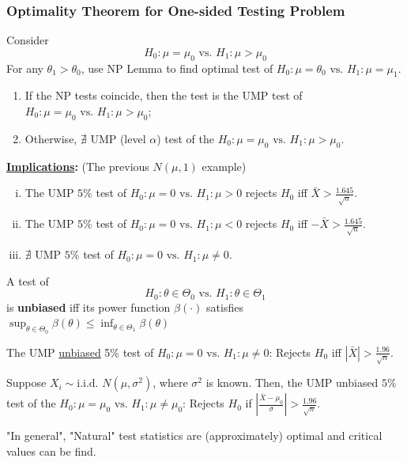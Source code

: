 \documentclass[11pt]{elegantbook}
\begin{document}
\subsubsection*{Optimality Theorem for One-sided Testing Problem}
Consider $$H_0:\mu=\mu_0 \text{ vs. }H_1:\mu>\mu_0$$
For any $\theta_1>\theta_0$, use NP Lemma to find optimal test of $H_0:\mu=\theta_0 \text{ vs. }H_1:\mu=\mu_1$.
\begin{enumerate}[$\circ$]
    \item If the NP tests coincide, then the test is the UMP test of $H_0:\mu=\mu_0 \text{ vs. }H_1:\mu>\mu_0$;
    \item Otherwise, $\nexists$ UMP (level $\alpha$) test of the $H_0:\mu=\mu_0 \text{ vs. }H_1:\mu>\mu_0$.
\end{enumerate}
\textbf{\underline{Implications}:} (The previous $N(\mu,1)$ example)
\begin{enumerate}[(i).]
    \item The UMP $5\%$ test of $H_0:\mu=0 \text{ vs. }H_1:\mu>0$ rejects $H_0$ iff $\bar{X}>\frac{1.645}{\sqrt{n}}$.
    \item The UMP $5\%$ test of $H_0:\mu=0 \text{ vs. }H_1:\mu<0$ rejects $H_0$ iff $-\bar{X}>\frac{1.645}{\sqrt{n}}$.
    \item $\nexists$ UMP $5\%$ test of $H_0:\mu=0 \text{ vs. }H_1:\mu\neq 0$.
\end{enumerate}

\begin{definition}
    \normalfont
    A test of $$H_0:\theta\in\Theta_0 \text{ vs. }H_1:\theta\in\Theta_1$$
    is \textbf{unbiased} iff its power function $\beta(\cdot)$ satisfies $\sup_{\theta\in\Theta_0}\beta(\theta)\leq \inf_{\theta\in\Theta_1}\beta(\theta)$
\end{definition}
\begin{claim}
    The UMP \underline{unbiased} 5\% test of $H_0:\mu=0 \text{ vs. }H_1:\mu\neq 0$: Rejects $H_0$ iff $|\bar{X}|>\frac{1.96}{\sqrt{n}}$.
\end{claim}
\begin{corollary}
    Suppose $X_i\sim \text{i.i.d. }N(\mu,\sigma^2)$, where $\sigma^2$ is known. Then, the UMP unbiased $5\%$ test of the $H_0:\mu=\mu_0 \text{ vs. }H_1:\mu\neq \mu_0$: Rejects $H_0$ if $|\frac{\bar{X}-\mu_0}{\sigma}|>\frac{1.96}{\sqrt{n}}$.
\end{corollary}

\begin{claim}
    "In general", "Natural" test statistics are (approximately) optimal and critical values can be find.
\end{claim}
\end{document}
